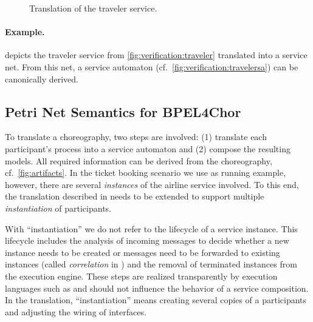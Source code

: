 \begin{figure}[tb]
\centering
{}\hfill
{}
\caption{Translation of the  traveler service.}\label{fig:verification:travelerpnsa}
\end{figure}


\paragraph{Example.}

 depicts the traveler service from \autoref{fig:verification:traveler} translated into a service net. From this net, a service automaton (cf.\ \autoref{fig:verification:travelersa}) can be canonically derived.




\subsection*{Petri Net Semantics for BPEL{\footnotesize 4}Chor}

To translate a \bpelchor{} choreography, two steps are involved: (1) translate each participant's  process into a service automaton and (2) compose the resulting models. All required information can be derived from the \bpelchor{} choreography, cf.~\autoref{fig:artifacts}. In the ticket booking scenario we use as running example, however, there are several \emph{instances} of the airline service involved. To this end, the translation described in \cite{Lohmann_2007_wsfm,Lohmann_2007_hubtr212} needs to be extended to support multiple \emph{instantiation} of participants.

With ``instantiation'' we do not refer to the lifecycle of a service instance. This lifecycle includes the analysis of incoming messages to decide whether a new instance needs to be created or messages need to be forwarded to existing instances (called \emph{correlation} in ) and the removal of terminated instances from the execution engine. These steps are realized transparently by execution languages such as  and should not influence the behavior of a service composition. In the translation, ``instantiation'' means  creating several copies of a participants and adjusting the wiring of interfaces.

